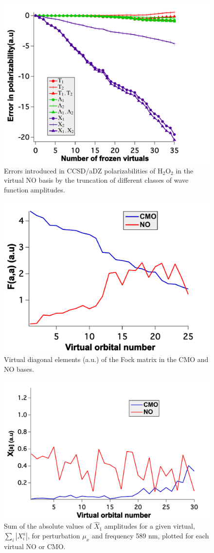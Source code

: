 \begin{figure}
  \centering
  \includegraphics[width=0.6\linewidth]{figures/amp_trunc_no.pdf}
  \caption{\footnotesize{Errors introduced in CCSD/aDZ polarizabilities of
H$_2$O$_2$ in the virtual NO basis by the truncation of different classes of wave
function amplitudes.}}
   \label{fig:amp_trunc_no}
\end{figure}
\begin{figure}
  \centering
  \includegraphics[width=0.6\linewidth]{figures/Faa.pdf}
  \caption{\footnotesize{Virtual diagonal elements (a.u.) of the Fock matrix in
the CMO and NO bases.}}
   \label{fig:Faa}
\end{figure}
\begin{figure}
  \centering
  \includegraphics[width=0.6\linewidth]{figures/X1.pdf}
  \caption{\footnotesize{Sum of the absolute values of $\hat{X}_1$
amplitudes for a given virtual, $\sum_i \left|X_i^a\right|$, for perturbation $\mu_x$
and frequency 589 nm, plotted for each virtual NO or CMO.}}
   \label{fig:X1}
\end{figure}
